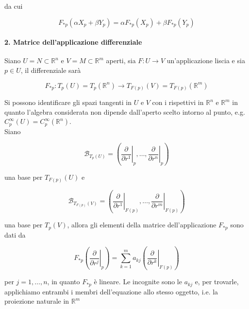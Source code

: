 da cui

\begin{equation}
	F_{*p}(\alpha X_{p} + \beta Y_{p}) = \alpha F_{*p}(X_{p}) + \beta F_{*p}(Y_{p})
\end{equation}

\paragraph{2. Matrice dell'applicazione differenziale}

Siano $ U = N \subset \mathbb{R}^{n} $ e $ V = M \subset \mathbb{R}^{m} $ aperti, sia $ F : U \to V $ un'applicazione liscia e sia $ p \in U $, il differenziale sarà

\begin{equation}
	F_{*p} : T_{p}(U) = T_{p}(\mathbb{R}^{n}) \to T_{F(p)}(V) = T_{F(p)}(\mathbb{R}^{m})
\end{equation}

Si possono identificare gli spazi tangenti in $ U $ e $ V $ con i rispettivi in $ \mathbb{R}^{n} $ e $ \mathbb{R}^{m} $ in quanto l'algebra considerata non dipende dall'aperto scelto intorno al punto, e.g. $ C_{p}^{\infty}(U) = C_{p}^{\infty}(\mathbb{R}^{n}) $.\\
Siano

\begin{equation}
	\mathcal{B}_{T_{p}(U)} = \left( \left. \dfrac{\partial}{\partial r^{1}} \right|_{p} , \dots , \left. \dfrac{\partial}{\partial r^{n}} \right|_{p} \right)
\end{equation}

una base per $ T_{F(p)}(U) $ e

\begin{equation}
	\mathcal{B}_{T_{F(p)}(V)} = \left( \left. \dfrac{\partial}{\partial r^{1}} \right|_{F(p)} , \dots , \left. \dfrac{\partial}{\partial r^{m}} \right|_{F(p)} \right)
\end{equation}

una base per $ T_{p}(V) $, allora gli elementi della matrice dell'applicazione $ F_{*p} $ sono dati da

\begin{equation}
	F_{*p} \left( \left. \dfrac{\partial}{\partial r^{j}} \right|_{p} \right) = \sum_{k=1}^{m} a_{kj} \left( \left. \dfrac{\partial}{\partial r^{k}} \right|_{F(p)} \right)
\end{equation}

per $ j=1,\dots,n $, in quanto $ F_{*p} $ è lineare. Le incognite sono le $ a_{kj} $ e, per trovarle, applichiamo entrambi i membri dell'equazione allo stesso oggetto, i.e. la proiezione naturale in $ \mathbb{R}^{m} $

